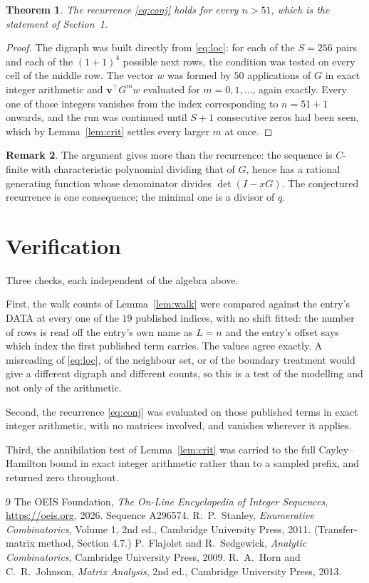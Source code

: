 \documentclass[11pt,a4paper]{article}
\theoremstyle{plain}
\newtheorem{theorem}{Theorem}
\theoremstyle{definition}
\newtheorem{remark}[theorem]{Remark}
\begin{document}
\begin{theorem}
The recurrence \eqref{eq:conj} holds for every $n>51$, which is the statement of
Section~1.
\end{theorem}

\begin{proof}
The digraph was built directly from \eqref{eq:loc}: for each of the $S=256$ pairs and each
of the $(1+1)^{4}$ possible next rows, the condition was tested on every cell of
the middle row. The vector $w$ was formed by $50$ applications of $G$ in exact integer
arithmetic and $\mathbf{v}^{\!\top}G^{m}w$ evaluated for $m=0,1,\dots$, again exactly.
Every one of those integers vanishes from the index corresponding to $n=51+1$ onwards,
and the run was continued until $S+1$ consecutive zeros had been seen, which by
Lemma~\ref{lem:crit} settles every larger $m$ at once.
\end{proof}

\begin{remark}
The argument gives more than the recurrence: the sequence is $C$-finite with characteristic
polynomial dividing that of $G$, hence has a rational generating function whose denominator
divides $\det(I-xG)$. The conjectured recurrence is one consequence; the minimal one is a
divisor of $q$.
\end{remark}

\section{Verification}

Three checks, each independent of the algebra above.

First, the walk counts of Lemma~\ref{lem:walk} were compared against the entry's DATA at
every one of the $19$ published indices, with no shift fitted: the number of rows is
read off the entry's own name as $L=n$ and the entry's offset says which index the first
published term carries. The values agree exactly. A misreading of \eqref{eq:loc}, of the
neighbour set, or of the boundary treatment would give a different digraph and different
counts, so this is a test of the modelling and not only of the arithmetic.

Second, the recurrence \eqref{eq:conj} was evaluated on those published terms in exact
integer arithmetic, with no matrices involved, and vanishes wherever it applies.

Third, the annihilation test of Lemma~\ref{lem:crit} was carried to the full
Cayley--Hamilton bound in exact integer arithmetic rather than to a sampled prefix, and
returned zero throughout.

\begin{thebibliography}{9}
 The OEIS Foundation, \emph{The On-Line Encyclopedia of Integer
Sequences}, \url{https://oeis.org}, 2026. Sequence A296574.
 R.~P.~Stanley, \emph{Enumerative Combinatorics}, Volume 1, 2nd ed.,
Cambridge University Press, 2011. (Transfer-matrix method, Section 4.7.)
 P.~Flajolet and R.~Sedgewick, \emph{Analytic Combinatorics}, Cambridge
University Press, 2009.
 R.~A.~Horn and C.~R.~Johnson, \emph{Matrix Analysis}, 2nd ed., Cambridge
University Press, 2013.
\end{thebibliography}
\end{document}
